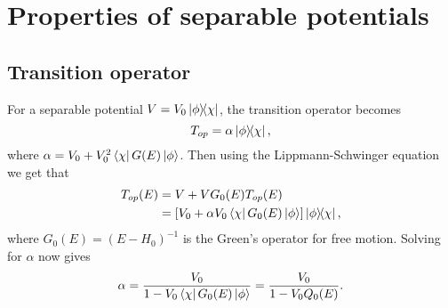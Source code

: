 
\chapter{Properties of separable potentials}
\label{Appendix:SeparablePotentials}

\section{Transition operator}
\label{Appendix:SeparablePotentials_TransitionOperator}
For a separable potential $V=V_0 \ketbra{\phi}{\chi}$, the transition operator becomes
\begin{equation}
T_{op}=\alpha \ketbra{\phi}{\chi},
\end{equation}
where $\alpha=V_{0}+V_{0}^{2}\bra{\chi}G(E)\ket{\phi}$. Then using the Lippmann-Schwinger equation we get that
%
\begin{align}
T_{op}(E)&=V+VG_{0}(E)T_{op}(E)
\nonumber \\
&= \left[V_{0}+\alpha V_{0} \bra{\chi}G_{0}(E)\ket{\phi}\right]\ketbra{\phi}{\chi},
\end{align}
%
where $G_{0}(E)=(E-H_{0})^{-1}$ is the Green's operator for free motion. Solving for $\alpha$ now gives
%
\begin{equation}
\alpha =\frac{V_{0}}{1-V_{0} \bra{\chi}G_{0}(E)\ket{\phi}}
		   =\frac{V_{0}}{1-V_{0} Q_{0}(E)}.
\end{equation}
%
%
%
%
%
